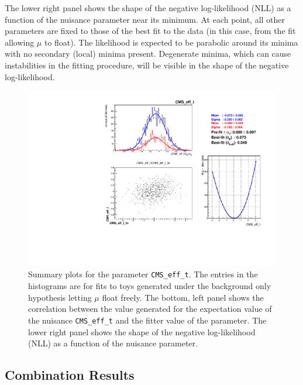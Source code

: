 The lower right panel shows the shape of the negative log-likelihood (NLL) as a function of the 
nuisance parameter near its minimum. At each point, all other parameters are fixed 
to those of the best fit to the data (in this case, from the fit allowing $\mu$ to float).
The likelihood is expected to be parabolic around its minima with no secondary (local) minima present.
Degenerate minima, which can cause instabilities in the fitting procedure, will be visible in the 
shape of the negative log-likelihood.


\begin{figure}[hbtp]
  \begin{center}
    \includegraphics[width=\textwidth]{combinations/diagnostics/tree_fit_sb_CMS_eff_t.pdf}
    \caption{Summary plots for the parameter \texttt{CMS\_eff\_t}. 
	The entries in the histograms are for fits to toys generated under the background only
	hypothesis letting $\mu$ float freely. The bottom, left panel shows the correlation
	between the value generated for the expectation value of the nuisance \texttt{CMS\_eff\_t} 
	and the fitter value of the parameter. The lower right panel shows the shape of the 
	negative log-likelihood (NLL) as a function of the nuisance parameter.}
    \label{fig:combination_cmsefft}
  \end{center}
\end{figure}


\subsection{Combination Results}


